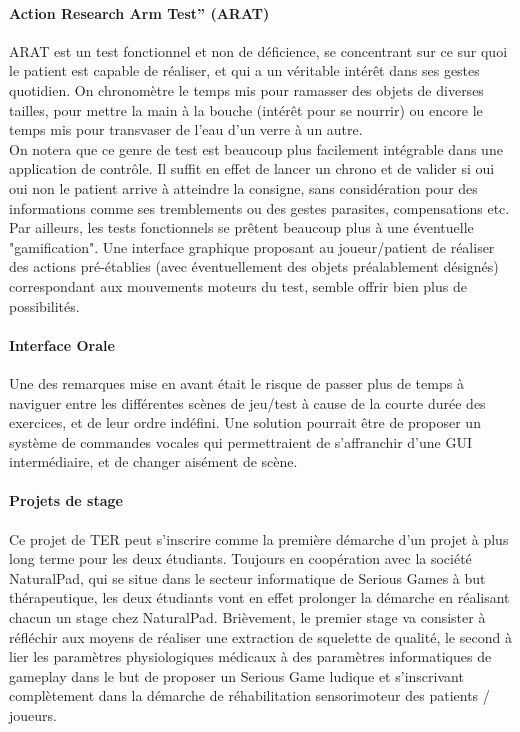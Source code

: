 \documentclass[french,12pt]{report}
\begin{document}
\paragraph{Action Research Arm Test” (ARAT) \\}
ARAT est un test fonctionnel et non de déficience, se concentrant sur ce sur quoi le patient est capable de réaliser, et
qui a un véritable intérêt dans ses gestes quotidien. On chronomètre le temps mis pour ramasser des objets de diverses tailles,
pour mettre la main à la bouche (intérêt pour se nourrir) ou encore le temps mis pour transvaser de l'eau d'un verre à un autre.
\\ On notera que ce genre de test est beaucoup plus facilement intégrable dans une application de contrôle. Il suffit en effet de 
lancer un chrono et de valider si oui oui non le patient arrive à atteindre la consigne, sans considération pour des informations
comme ses tremblements ou des gestes parasites, compensations etc. Par ailleurs, les tests fonctionnels se prêtent beaucoup
plus à une éventuelle "gamification". Une interface graphique proposant au joueur/patient de réaliser des actions pré-établies (avec éventuellement des objets préalablement désignés) correspondant aux mouvements moteurs du test, semble offrir bien
plus de possibilités.

\paragraph{Interface Orale}
Une des remarques mise en avant était le risque de passer plus de temps à naviguer entre les différentes scènes de jeu/test à cause de la courte durée des exercices, et de leur ordre indéfini. Une solution pourrait être de proposer un système de 
commandes vocales qui permettraient de s'affranchir d'une GUI intermédiaire, et de changer aisément de scène.

\paragraph{Projets de stage} %
Ce projet de TER peut s'inscrire comme la première démarche d'un projet à plus long terme pour les deux étudiants. Toujours
en coopération avec la société NaturalPad, qui se situe dans le secteur informatique de Serious Games à but 
thérapeutique, les deux étudiants vont en effet prolonger la démarche en réalisant chacun un stage chez NaturalPad. Brièvement,
le premier stage va consister à réfléchir aux moyens de réaliser une extraction de squelette de qualité, le second à lier les
paramètres physiologiques médicaux à des paramètres informatiques de gameplay dans le but de proposer un Serious Game
ludique et s'inscrivant complètement dans la démarche de réhabilitation sensorimoteur des patients / joueurs.	
\end{document}
